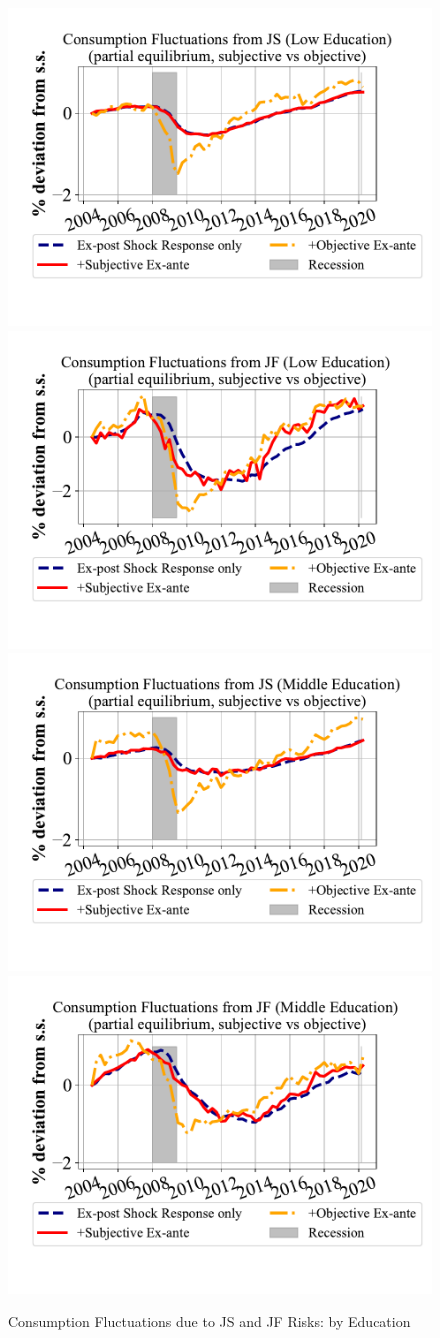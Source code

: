   \begin{figure}
        \centering
          \caption{Consumption Fluctuations due to JS and JF Risks: by Education}
\label{appendix_pe_decompose_sub_obj_educ}
\includegraphics[width=0.4\linewidth]{Figures/consumption_pe_JS_deviation_machine_as_rational_LowEdu.pdf}
\includegraphics[width=0.4\linewidth]{Figures/consumption_pe_JF_deviation_machine_as_rational_LowEdu.pdf}
\\
\includegraphics[width=0.4\linewidth]{Figures/consumption_pe_JS_deviation_machine_as_rational_MidEdu.pdf}
\includegraphics[width=0.4\linewidth]{Figures/consumption_pe_JF_deviation_machine_as_rational_MidEdu.pdf}
\\


\end{figure}
